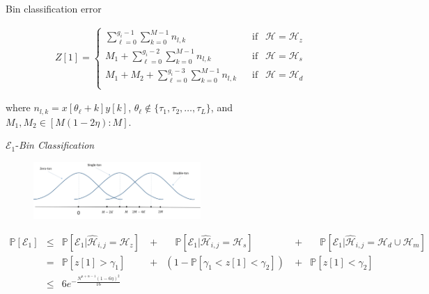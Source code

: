 \documentclass[10pt,xcolor=table]{beamer}
\newcommand{\mc}{\mathcal}
\newcommand{\mbb}{\mathbb}
\begin{document}
\begin{frame}{Bin classification error}
\vspace{-10pt}
{ \small
	\begin{align*} \nonumber
	Z[1]=\begin{cases}
	\sum\limits_{\ell=0}^{g_{i}-1}\sum\limits_{k=0}^{M-1} n_{l,k}  & ~~\text{ if } ~~ \mc{H}=\mc{H}_z\label{Eqn:BinCombination}\\
	M_1+\sum\limits_{\ell=0}^{g_{i}-2}\sum\limits_{k=0}^{M-1} n_{l,k}  & ~~\text{ if } ~~ \mc{H}=\mc{H}_s\\
	M_1+M_2+\sum\limits_{\ell=0}^{g_{i}-3}\sum\limits_{k=0}^{M-1} n_{l,k}  & ~~\text{ if } ~~ \mc{H}=\mc{H}_d\\
	\end{cases}
	\end{align*}
	
	where $n_{l,k}=x[\theta_{\ell}+k]y[k]$,  $\theta_{\ell}\notin\{\tau_1,\tau_2,\ldots,\tau_L\}$, and  $M_1,M_2\in[M(1-2\eta):M]$.
}


\begin{block}{$\mathcal{E}_1${-\it Bin Classification}}
	\begin{figure}[t]
		\begin{center}
			\includegraphics[width=2.5in]{bin_statistics.pdf}
		\end{center}
	\end{figure}
	\vspace{-30pt}
	
	{\small \begin{align*}
		\mbb{P}[\mathcal{E}_1] & \leq & \mbb{P}[\mathcal{E}_1|\widehat{\mathcal{H}}_{i,j}=\mc{H}_z]~& + &
		\quad \mbb{P}[\mathcal{E}_1|\widehat{\mathcal{H}}_{i,j}=\mathcal{H}_s]~~~~~& + &
		\quad \mbb{P}[\mc{E}_1|\widehat{\mathcal{H}}_{i,j}=\mathcal{H}_d \cup \mathcal{H}_m]\\
		~& = & \mbb{P}[z[1]>\gamma_1] ~& + & (1- \mbb{P}[\gamma_1<z[1]<\gamma_2])  ~& + & \mbb{P}[z[1]<\gamma_2]~~~~~~\\
        & \leq & 6e^{-\frac{N^{\mu+\alpha-1}(1-6\eta)^2}{16}} \\
		\end{align*}		
	}
	\vspace{-15pt}
\end{block}
\end{frame}
\end{document}
